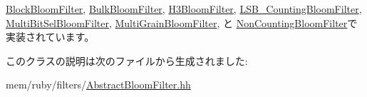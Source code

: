 \hyperlink{classBlockBloomFilter_ac188318778d26b44f567c5b530598c16}{BlockBloomFilter}, \hyperlink{classBulkBloomFilter_ac188318778d26b44f567c5b530598c16}{BulkBloomFilter}, \hyperlink{classH3BloomFilter_ac188318778d26b44f567c5b530598c16}{H3BloomFilter}, \hyperlink{classLSB__CountingBloomFilter_ac188318778d26b44f567c5b530598c16}{LSB\_\-CountingBloomFilter}, \hyperlink{classMultiBitSelBloomFilter_ac188318778d26b44f567c5b530598c16}{MultiBitSelBloomFilter}, \hyperlink{classMultiGrainBloomFilter_ac188318778d26b44f567c5b530598c16}{MultiGrainBloomFilter}, と \hyperlink{classNonCountingBloomFilter_ac188318778d26b44f567c5b530598c16}{NonCountingBloomFilter}で実装されています。

このクラスの説明は次のファイルから生成されました:\begin{DoxyCompactItemize}
\item 
mem/ruby/filters/\hyperlink{AbstractBloomFilter_8hh}{AbstractBloomFilter.hh}\end{DoxyCompactItemize}
